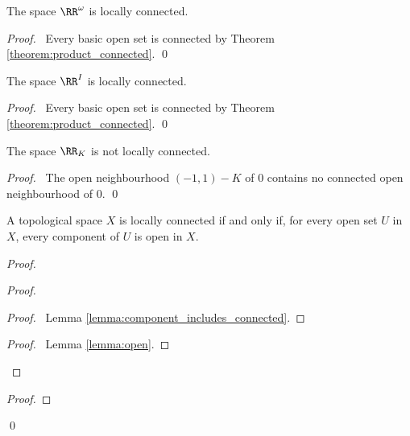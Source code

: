 \begin{proposition}
    The space $\RR^\omega$ is locally connected.
\end{proposition}

\begin{proof}
    \pf\ Every basic open set is connected by Theorem \ref{theorem:product_connected}. \qed
\end{proof}

\begin{proposition}
    The space $\RR^I$ is locally connected.
\end{proposition}

\begin{proof}
    \pf\ Every basic open set is connected by Theorem \ref{theorem:product_connected}. \qed
\end{proof}

\begin{proposition}
    The space $\RR_K$ is not locally connected.
\end{proposition}

\begin{proof}
    \pf\ The open neighbourhood $(-1,1) - K$ of 0 contains
    no connected open neighbourhood of 0. \qed
\end{proof}

\begin{theorem}
    \label{theorem:open_component_locally_connected}
    A topological space $X$ is locally connected if and only if, for every
    open set $U$ in $X$, every component of $U$ is open in $X$.
\end{theorem}

\begin{proof}
    \pf
    \begin{proof}
        \begin{proof}
            \pf\ Lemma \ref{lemma:component_includes_connected}.
        \end{proof}
        \qedstep
        \begin{proof}
            \pf\ Lemma \ref{lemma:open}.
        \end{proof}
    \end{proof}
    \begin{proof}
    \end{proof}
    \qed
\end{proof}

